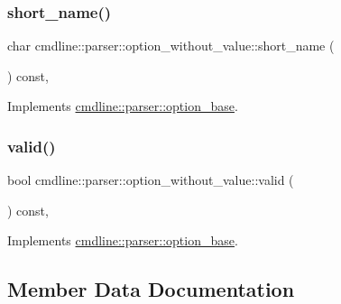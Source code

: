 \subsubsection{\texorpdfstring{short\_name()}{short\_name()}}
{\footnotesize\ttfamily char cmdline\+::parser\+::option\+\_\+without\+\_\+value\+::short\+\_\+name (\begin{DoxyParamCaption}{ }\end{DoxyParamCaption}) const\hspace{0.3cm}{\ttfamily [inline]}, {\ttfamily [virtual]}}



Implements \mbox{\hyperlink{classcmdline_1_1parser_1_1option__base_aeea790198b8097ccb98a5a9063d3c81f}{cmdline\+::parser\+::option\+\_\+base}}.

\mbox{\label{classcmdline_1_1parser_1_1option__without__value_ad1dd50b3fd7c7020d817d1e173240ba3}} 
\subsubsection{\texorpdfstring{valid()}{valid()}}
{\footnotesize\ttfamily bool cmdline\+::parser\+::option\+\_\+without\+\_\+value\+::valid (\begin{DoxyParamCaption}{ }\end{DoxyParamCaption}) const\hspace{0.3cm}{\ttfamily [inline]}, {\ttfamily [virtual]}}



Implements \mbox{\hyperlink{classcmdline_1_1parser_1_1option__base_ae0f802a846608195166bc5ad925462e2}{cmdline\+::parser\+::option\+\_\+base}}.



\subsection{Member Data Documentation}
\mbox{\label{classcmdline_1_1parser_1_1option__without__value_aef631becaab8312bd32051815f63275b}} 
